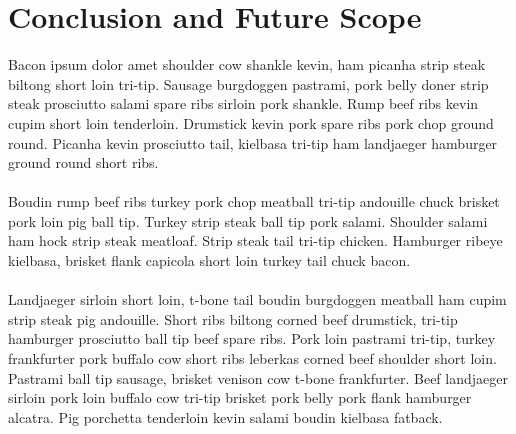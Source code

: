 \chapter{Conclusion and Future Scope}

    Bacon ipsum dolor amet shoulder cow shankle kevin, ham picanha strip steak biltong short loin tri-tip. Sausage burgdoggen pastrami, pork belly doner strip steak prosciutto salami spare ribs sirloin pork shankle. Rump beef ribs kevin cupim short loin tenderloin. Drumstick kevin pork spare ribs pork chop ground round. Picanha kevin prosciutto tail, kielbasa tri-tip ham landjaeger hamburger ground round short ribs. \\ \\
    Boudin rump beef ribs turkey pork chop meatball tri-tip andouille chuck brisket pork loin pig ball tip. Turkey strip steak ball tip pork salami. Shoulder salami ham hock strip steak meatloaf. Strip steak tail tri-tip chicken. Hamburger ribeye kielbasa, brisket flank capicola short loin turkey tail chuck bacon. \\ \\
    Landjaeger sirloin short loin, t-bone tail boudin burgdoggen meatball ham cupim strip steak pig andouille. Short ribs biltong corned beef drumstick, tri-tip hamburger prosciutto ball tip beef spare ribs. Pork loin pastrami tri-tip, turkey frankfurter pork buffalo cow short ribs leberkas corned beef shoulder short loin. Pastrami ball tip sausage, brisket venison cow t-bone frankfurter. Beef landjaeger sirloin pork loin buffalo cow tri-tip brisket pork belly pork flank hamburger alcatra. Pig porchetta tenderloin kevin salami boudin kielbasa fatback.
